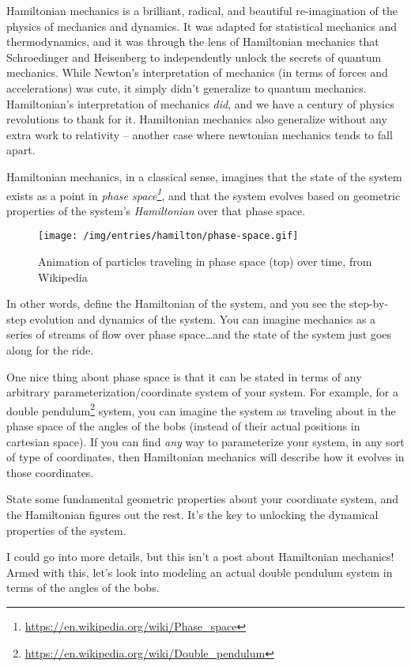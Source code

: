 \documentclass[]{article}
\renewcommand{\href}[2]{#2\footnote{\url{#1}}}
\begin{document}
Hamiltonian mechanics is a brilliant, radical, and beautiful re-imagination of
the physics of mechanics and dynamics. It was adapted for statistical mechanics
and thermodynamics, and it was through the lens of Hamiltonian mechanics that
Schroedinger and Heisenberg to independently unlock the secrets of quantum
mechanics. While Newton's interpretation of mechanics (in terms of forces and
accelerations) was cute, it simply didn't generalize to quantum mechanics.
Hamiltonian's interpretation of mechanics \emph{did}, and we have a century of
physics revolutions to thank for it. Hamiltonian mechanics also generalize
without any extra work to relativity -- another case where newtonian mechanics
tends to fall apart.

Hamiltonian mechanics, in a classical sense, imagines that the state of the
system exists as a point in
\emph{\href{https://en.wikipedia.org/wiki/Phase_space}{phase space}}, and that
the system evolves based on geometric properties of the system's
\emph{Hamiltonian} over that phase space.

\begin{figure}[htbp]
\centering
\texttt{[image: /img/entries/hamilton/phase-space.gif]}
\caption{Animation of particles traveling in phase space (top) over time, from
Wikipedia}
\end{figure}

In other words, define the Hamiltonian of the system, and you see the
step-by-step evolution and dynamics of the system. You can imagine mechanics as
a series of streams of flow over phase space\ldots{}and the state of the system
just goes along for the ride.

One nice thing about phase space is that it can be stated in terms of any
arbitrary parameterization/coordinate system of your system. For example, for a
\href{https://en.wikipedia.org/wiki/Double_pendulum}{double pendulum} system,
you can imagine the system as traveling about in the phase space of the angles
of the bobs (instead of their actual positions in cartesian space). If you can
find \emph{any} way to parameterize your system, in any sort of type of
coordinates, then Hamiltonian mechanics will describe how it evolves in those
coordinates.

State some fundamental geometric properties about your coordinate system, and
the Hamiltonian figures out the rest. It's the key to unlocking the dynamical
properties of the system.

I could go into more details, but this isn't a post about Hamiltonian mechanics!
Armed with this, let's look into modeling an actual double pendulum system in
terms of the angles of the bobs.
\end{document}
